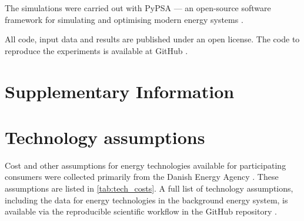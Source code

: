 \documentclass[11pt, 5p, nopreprintline]{elsarticle}
\begin{document}
The simulations were carried out with PyPSA --- an open-source software framework for simulating and optimising modern energy systems \cite{brownPyPSAPythonPower2018}.

All code, input data and results are published under an open license. The code to reproduce the experiments is available at GitHub \cite{github-247CFEpaper}.

\printglossary[type=\acronymtype]

\renewcommand{\ttdefault}{\sfdefault}



\newpage

\makeatletter
\renewcommand \thesection{S\@arabic\c@section}
\renewcommand\thetable{S\@arabic\c@table}
\renewcommand \thefigure{S\@arabic\c@figure}
\makeatother
\renewcommand{\citenumfont}[1]{S#1}
\setcounter{equation}{0}
\setcounter{figure}{0}
\setcounter{table}{0}
\setcounter{section}{0}


\section*{Supplementary Information}
\label{sec:si}

\section{Technology assumptions}
\label{sec:si_1}


Cost and other assumptions for energy technologies available for participating consumers were collected primarily from the Danish Energy Agency \cite{DEA-technologydata}. These assumptions are listed in \cref{tab:tech_costs}.
A full list of technology assumptions, including the data for energy technologies in the background energy system, is available via the reproducible scientific workflow in the GitHub repository \cite{github-247CFEpaper}.
\end{document}
